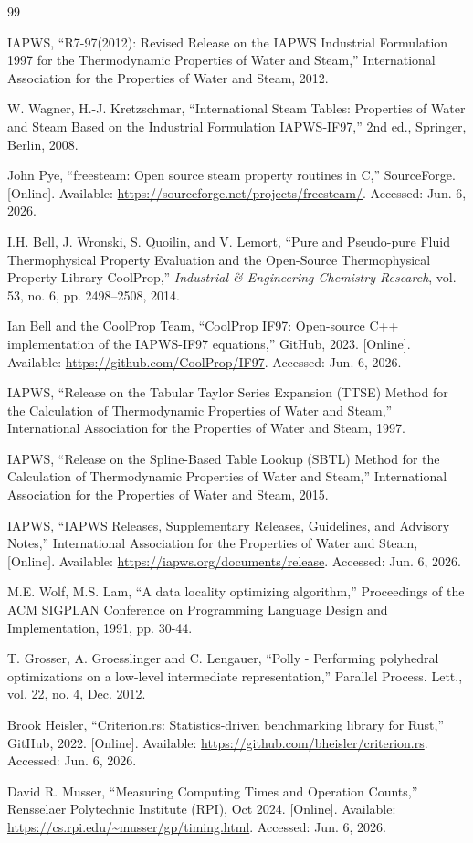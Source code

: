 \documentclass{article}
\begin{document}
\begin{thebibliography}{99}

IAPWS, ``R7-97(2012): Revised Release on the IAPWS Industrial Formulation 1997 for the Thermodynamic Properties of Water and Steam,'' International Association for the Properties of Water and Steam, 2012.

W. Wagner, H.-J. Kretzschmar, ``International Steam Tables: Properties of Water and Steam Based on the Industrial Formulation IAPWS-IF97,'' 2nd ed., Springer, Berlin, 2008.

John Pye, ``freesteam: Open source steam property routines in C,'' SourceForge. [Online]. Available: \url{https://sourceforge.net/projects/freesteam/}. Accessed: Jun. 6, 2026.

I.H. Bell, J. Wronski, S. Quoilin, and V. Lemort, ``Pure and Pseudo-pure Fluid Thermophysical Property Evaluation and the Open-Source Thermophysical Property Library CoolProp,'' \textit{Industrial \& Engineering Chemistry Research}, vol. 53, no. 6, pp. 2498--2508, 2014.

Ian Bell and the CoolProp Team, ``CoolProp IF97: Open-source C++ implementation of the IAPWS-IF97 equations,'' GitHub, 2023. [Online]. Available: \url{https://github.com/CoolProp/IF97}. Accessed: Jun. 6, 2026.

IAPWS, ``Release on the Tabular Taylor Series Expansion (TTSE) Method for the Calculation of Thermodynamic Properties of Water and Steam,'' International Association for the Properties of Water and Steam, 1997.

IAPWS, ``Release on the Spline-Based Table Lookup (SBTL) Method for the Calculation of Thermodynamic Properties of Water and Steam,'' International Association for the Properties of Water and Steam, 2015.

IAPWS, ``IAPWS Releases, Supplementary Releases, Guidelines, and Advisory Notes,'' International Association for the Properties of Water and Steam, [Online]. Available: \url{https://iapws.org/documents/release}. Accessed: Jun. 6, 2026.

M.E. Wolf, M.S. Lam, ``A data locality optimizing algorithm,'' Proceedings of the ACM SIGPLAN Conference on Programming Language Design and Implementation, 1991, pp. 30-44.

T. Grosser, A. Groesslinger and C. Lengauer, ``Polly - Performing polyhedral optimizations on a low-level intermediate representation,'' Parallel Process. Lett., vol. 22, no. 4, Dec. 2012.

Brook Heisler, ``Criterion.rs: Statistics-driven benchmarking library for Rust,'' GitHub, 2022. [Online]. Available: \url{https://github.com/bheisler/criterion.rs}. Accessed: Jun. 6, 2026.

David R. Musser, ``Measuring Computing Times and Operation Counts,'' Rensselaer Polytechnic Institute (RPI), Oct 2024.
[Online]. Available: \url{https://cs.rpi.edu/~musser/gp/timing.html}. Accessed: Jun. 6, 2026.
\end{thebibliography}
\end{document}
